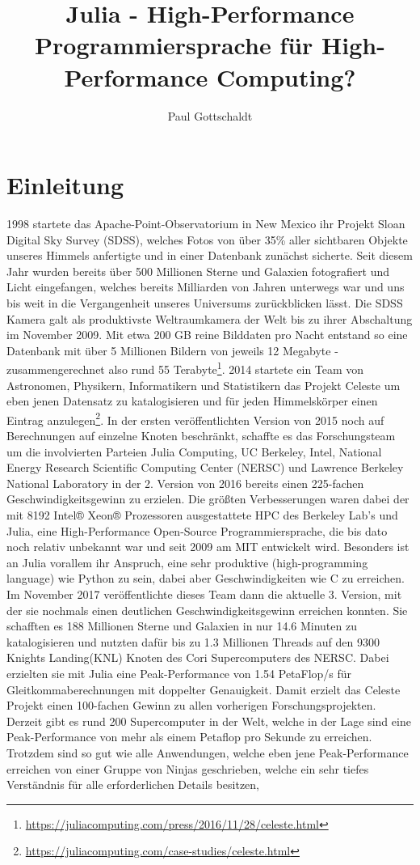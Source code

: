 \documentclass[proseminar,german,utf8]{zihpub}
\author{Paul Gottschaldt}
\title{Julia - High-Performance Programmiersprache für High-Performance Computing?}
\begin{document}
\section {Einleitung}
1998 startete das Apache-Point-Observatorium in New Mexico ihr Projekt Sloan Digital Sky Survey (SDSS), welches Fotos von über 35\% aller sichtbaren Objekte unseres Himmels anfertigte und in einer Datenbank zunächst sicherte. Seit diesem Jahr wurden bereits über 500 Millionen Sterne und Galaxien fotografiert und Licht eingefangen, welches bereits Milliarden von Jahren unterwegs war und uns bis weit in die Vergangenheit unseres Universums zurückblicken lässt. Die SDSS Kamera galt als produktivste Weltraumkamera der Welt bis zu ihrer Abschaltung im November 2009. Mit etwa 200 GB reine Bilddaten pro Nacht entstand so eine Datenbank mit über 5 Millionen Bildern von jeweils 12 Megabyte - zusammengerechnet also rund 55 Terabyte\footnote{\url{https://juliacomputing.com/press/2016/11/28/celeste.html}}. 2014 startete ein Team von Astronomen, Physikern, Informatikern und Statistikern das Projekt Celeste um eben jenen Datensatz zu katalogisieren und für jeden Himmelskörper einen Eintrag anzulegen\footnote{\url{https://juliacomputing.com/case-studies/celeste.html}}. In der ersten veröffentlichten Version von 2015 noch auf Berechnungen auf einzelne Knoten beschränkt, schaffte es das Forschungsteam um die involvierten Parteien Julia Computing, UC Berkeley, Intel, National Energy Research Scientific Computing Center (NERSC) und Lawrence Berkeley National Laboratory in der 2. Version von 2016 bereits einen 225-fachen Geschwindigkeitsgewinn zu erzielen. Die größten Verbesserungen waren dabei der mit 8192 Intel® Xeon® Prozessoren ausgestattete HPC des Berkeley Lab's und Julia, eine High-Performance Open-Source Programmiersprache, die bis dato noch relativ unbekannt war und seit 2009 am MIT entwickelt wird. Besonders ist an Julia vorallem ihr Anspruch, eine sehr produktive (high-programming language) wie Python zu sein, dabei aber Geschwindigkeiten wie C zu erreichen. Im November 2017 veröffentlichte dieses Team dann die aktuelle 3. Version, mit der sie nochmals einen deutlichen Geschwindigkeitsgewinn erreichen konnten. Sie schafften es 188 Millionen Sterne und Galaxien in nur 14.6 Minuten zu katalogisieren und nutzten dafür bis zu 1.3 Millionen Threads auf den 9300 Knights Landing(KNL) Knoten des Cori Supercomputers des NERSC. Dabei erzielten sie mit Julia eine Peak-Performance von 1.54 PetaFlop/s für Gleitkommaberechnungen mit doppelter Genauigkeit. Damit erzielt das Celeste Projekt einen 100-fachen Gewinn zu allen vorherigen Forschungsprojekten. Derzeit gibt es rund 200 Supercomputer in der Welt, welche in der Lage sind eine Peak-Performance von mehr als einem Petaflop pro Sekunde zu erreichen. Trotzdem sind so gut wie alle Anwendungen, welche eben jene Peak-Performance erreichen von einer Gruppe von Ninjas geschrieben, welche ein sehr tiefes Verständnis für alle erforderlichen Details besitzen, 
\end{document}

